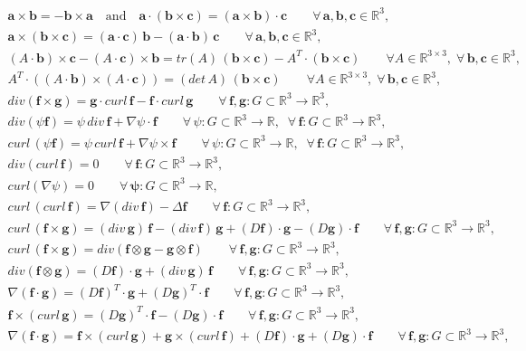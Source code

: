 \documentclass{article}
\theoremstyle{definition}
\theoremstyle{remark}
\renewcommand{\vec}[1]{\mathbf{#1}}
\newcommand{\R}{\mathbb{R}}
\newcommand{\R}{{\mathbb{R}}}
\begin{document}
%
%
%
%
\begin{align}
\vec a\times \vec b=-\vec b\times\vec a\quad\text{and}\quad \vec
a\cdot(\vec b\times\vec c)=(\vec a\times\vec b)\cdot\vec
c\quad\quad\forall\,\vec a,\vec b,\vec c\in\R^3,\label{apfrm1}\\
\vec a\times(\vec b\times\vec c)=(\vec a\cdot\vec c)\,\vec b-(\vec
a\cdot\vec b)\,\vec c\quad\quad\forall\,\vec a,\vec b,\vec
c\in\R^3,\label{apfrm2}\\
(A\cdot \vec b)\times \vec c-(A\cdot \vec c)\times \vec
b=tr(A)\,(\vec b\times \vec c)-A^T\cdot(\vec b\times \vec
c)\quad\quad\forall A\in\R^{3\times 3},\;\forall\,\vec b,\vec
c\in\R^3,\label{apfrm10}\\
A^T\cdot\left((A\cdot \vec b)\times (A\cdot \vec c)\right)=(det\,
A)\,(\vec b\times \vec c)\quad\quad\forall A\in\R^{3\times
3},\;\forall\,\vec b,\vec
c\in\R^3,\label{apfrm90}\\
{div}(\vec f\times \vec g)=\vec g\cdot curl\,\vec f-\vec f\cdot
curl\,\vec g\quad\quad
\forall\,\vec f,\vec g:G\subset\R^3\to\R^3,\label{apfrm3}\\
{div}(\psi \vec f)=\psi\,{div}\, \vec f+\nabla\psi\cdot \vec
f\quad\quad
\forall\,\psi:G\subset\R^3\to\R,\;\;
\forall\,\vec f:G\subset\R^3\to\R^3,\label{apfrm4}\\
curl\,(\psi \vec f)=\psi\,curl\, \vec f+\nabla\psi\times \vec
f\quad\quad \forall\,\psi:G\subset\R^3\to\R,\;\;
\forall\,\vec f:G\subset\R^3\to\R^3,\label{apfrm5}\\
{div}\left(curl\,\vec f\right)=0\quad\quad\forall\,\vec
f:G\subset\R^3\to\R^3,\label{apfrm11}\\
{curl}\left(\nabla\psi\right)=0\quad\quad\forall\,\vec
\psi:G\subset\R^3\to\R,\label{apfrm100}
\\ curl\,\left(curl\,\vec f\right)=\nabla\left({div}\, \vec f\right)-\Delta\vec
f\quad\quad\forall\,\vec f:G\subset\R^3\to\R^3,\label{apfrm12}
\\ curl\,(\vec f\times \vec g)=({div}\, \vec g)\,\vec f -({div}\, \vec
f)\,\vec g +(D \vec f)\cdot \vec g-(D \vec g)\cdot \vec f\quad\quad
\forall\,\vec f,\vec g:G\subset\R^3\to\R^3,\label{apfrm6}\\
curl\,(\vec f\times \vec g)=div\left(\vec f\otimes \vec g-\vec
g\otimes \vec f\right)\quad\quad
\forall\,\vec f,\vec g:G\subset\R^3\to\R^3,\label{apfrm6kkk}\\
div\left(\vec f\otimes \vec g\right)=(D \vec f)\cdot \vec g+({div}\,
\vec g)\,\vec f\quad\quad
\forall\,\vec f,\vec g:G\subset\R^3\to\R^3,\label{apfrm6kkkppp}\\
\nabla(\vec f\cdot \vec g)=(D \vec f)^T\cdot \vec g+(D
\vec g)^T\cdot \vec f\quad\quad \forall\,\vec f,\vec g:G\subset\R^3\to\R^3,\label{apfrm7}\\
\vec f\times(curl\,\vec g)=(D \vec g)^T\cdot \vec f-(D
\vec g)\cdot \vec f\quad\quad \forall\,\vec f,\vec g:G\subset\R^3\to\R^3,\label{apfrm9}\\
\nabla(\vec f\cdot \vec g)=\vec f\times(curl\,\vec g)+\vec
g\times(curl\,\vec f)+(D \vec f)\cdot \vec g+(D \vec g)\cdot \vec
f\quad\quad \forall\,\vec f,\vec
g:G\subset\R^3\to\R^3,\label{apfrm8}
\end{align}
\end{document}
